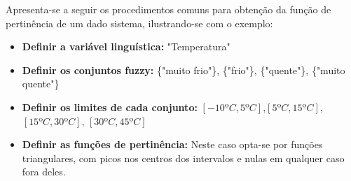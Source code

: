 Apresenta-se a seguir os procedimentos comuns para obtenção da função de pertinência de um dado sistema, ilustrando-se com o exemplo:
\begin{itemize}
	\item \textbf{Definir a variável linguística:} "Temperatura"
	\item \textbf{Definir os conjuntos fuzzy:} \{"muito frio"\}, \{"frio"\}, \{"quente"\}, \{"muito quente"\}
	\item \textbf{Definir os limites de cada conjunto:} $[-10ºC,5ºC]$,$ [5ºC,15ºC]$, $[15ºC,30ºC]$, $[30ºC,45ºC]$ 
	\item \textbf{Definir as funções de pertinência:} Neste caso opta-se por funções triangulares, com picos nos centros dos intervalos e nulas em qualquer caso fora deles.
\end{itemize}

